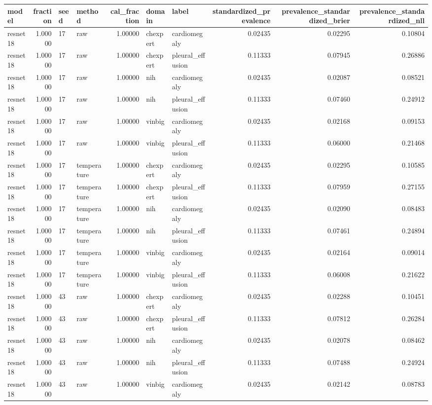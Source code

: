\begin{tabular}{lrllrllrrr}
\toprule
model & fraction & seed & method & cal\_fraction & domain & label & standardized\_prevalence & prevalence\_standardized\_brier & prevalence\_standardized\_nll \\
\midrule
resnet18 & 1.00000 & 17 & raw & 1.00000 & chexpert & cardiomegaly & 0.02435 & 0.02295 & 0.10804 \\
resnet18 & 1.00000 & 17 & raw & 1.00000 & chexpert & pleural\_effusion & 0.11333 & 0.07945 & 0.26886 \\
resnet18 & 1.00000 & 17 & raw & 1.00000 & nih & cardiomegaly & 0.02435 & 0.02087 & 0.08521 \\
resnet18 & 1.00000 & 17 & raw & 1.00000 & nih & pleural\_effusion & 0.11333 & 0.07460 & 0.24912 \\
resnet18 & 1.00000 & 17 & raw & 1.00000 & vinbig & cardiomegaly & 0.02435 & 0.02168 & 0.09153 \\
resnet18 & 1.00000 & 17 & raw & 1.00000 & vinbig & pleural\_effusion & 0.11333 & 0.06000 & 0.21468 \\
resnet18 & 1.00000 & 17 & temperature & 1.00000 & chexpert & cardiomegaly & 0.02435 & 0.02295 & 0.10585 \\
resnet18 & 1.00000 & 17 & temperature & 1.00000 & chexpert & pleural\_effusion & 0.11333 & 0.07959 & 0.27155 \\
resnet18 & 1.00000 & 17 & temperature & 1.00000 & nih & cardiomegaly & 0.02435 & 0.02090 & 0.08483 \\
resnet18 & 1.00000 & 17 & temperature & 1.00000 & nih & pleural\_effusion & 0.11333 & 0.07461 & 0.24894 \\
resnet18 & 1.00000 & 17 & temperature & 1.00000 & vinbig & cardiomegaly & 0.02435 & 0.02164 & 0.09014 \\
resnet18 & 1.00000 & 17 & temperature & 1.00000 & vinbig & pleural\_effusion & 0.11333 & 0.06008 & 0.21622 \\
resnet18 & 1.00000 & 43 & raw & 1.00000 & chexpert & cardiomegaly & 0.02435 & 0.02288 & 0.10451 \\
resnet18 & 1.00000 & 43 & raw & 1.00000 & chexpert & pleural\_effusion & 0.11333 & 0.07812 & 0.26284 \\
resnet18 & 1.00000 & 43 & raw & 1.00000 & nih & cardiomegaly & 0.02435 & 0.02078 & 0.08462 \\
resnet18 & 1.00000 & 43 & raw & 1.00000 & nih & pleural\_effusion & 0.11333 & 0.07488 & 0.24924 \\
resnet18 & 1.00000 & 43 & raw & 1.00000 & vinbig & cardiomegaly & 0.02435 & 0.02142 & 0.08783 \\

\end{tabular}
